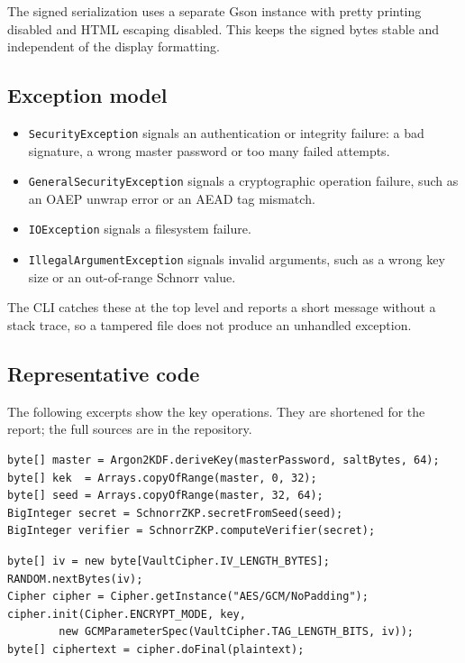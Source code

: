 \documentclass[11pt,a4paper]{article}
\newcommand{\code}[1]{\texttt{#1}}
\begin{document}
The signed serialization uses a separate Gson instance with pretty printing
disabled and HTML escaping disabled. This keeps the signed bytes stable and
independent of the display formatting.

\subsection{Exception model}

\begin{itemize}[leftmargin=*]
  \item \code{SecurityException} signals an authentication or integrity failure:
        a bad signature, a wrong master password or too many failed attempts.
  \item \code{GeneralSecurityException} signals a cryptographic operation
        failure, such as an OAEP unwrap error or an AEAD tag mismatch.
  \item \code{IOException} signals a filesystem failure.
  \item \code{IllegalArgumentException} signals invalid arguments, such as a
        wrong key size or an out-of-range Schnorr value.
\end{itemize}

The CLI catches these at the top level and reports a short message without a
stack trace, so a tampered file does not produce an unhandled exception.

\subsection{Representative code}

The following excerpts show the key operations. They are shortened for the
report; the full sources are in the repository.

\begin{lstlisting}[style=java,caption={Argon2id output split into KEK and Schnorr seed.},label={lst:argon}]
byte[] master = Argon2KDF.deriveKey(masterPassword, saltBytes, 64);
byte[] kek  = Arrays.copyOfRange(master, 0, 32);
byte[] seed = Arrays.copyOfRange(master, 32, 64);
BigInteger secret = SchnorrZKP.secretFromSeed(seed);
BigInteger verifier = SchnorrZKP.computeVerifier(secret);
\end{lstlisting}

\begin{lstlisting}[style=java,caption={AES-256-GCM with a fresh 96-bit nonce.},label={lst:gcm}]
byte[] iv = new byte[VaultCipher.IV_LENGTH_BYTES];
RANDOM.nextBytes(iv);
Cipher cipher = Cipher.getInstance("AES/GCM/NoPadding");
cipher.init(Cipher.ENCRYPT_MODE, key,
        new GCMParameterSpec(VaultCipher.TAG_LENGTH_BITS, iv));
byte[] ciphertext = cipher.doFinal(plaintext);
\end{lstlisting}
\end{document}
